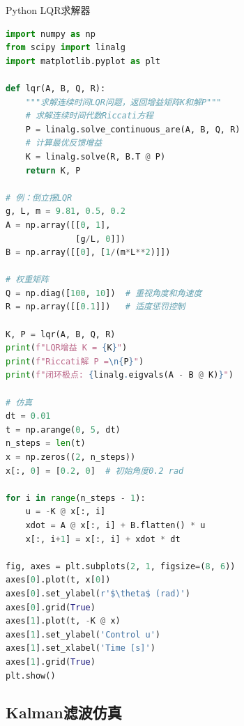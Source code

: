 \begin{mycode}{Python LQR求解器}
\begin{lstlisting}[language=Python]
import numpy as np
from scipy import linalg
import matplotlib.pyplot as plt

def lqr(A, B, Q, R):
    """求解连续时间LQR问题，返回增益矩阵K和解P"""
    # 求解连续时间代数Riccati方程
    P = linalg.solve_continuous_are(A, B, Q, R)
    # 计算最优反馈增益
    K = linalg.solve(R, B.T @ P)
    return K, P

# 例：倒立摆LQR
g, L, m = 9.81, 0.5, 0.2
A = np.array([[0, 1],
              [g/L, 0]])
B = np.array([[0], [1/(m*L**2)]])

# 权重矩阵
Q = np.diag([100, 10])  # 重视角度和角速度
R = np.array([[0.1]])   # 适度惩罚控制

K, P = lqr(A, B, Q, R)
print(f"LQR增益 K = {K}")
print(f"Riccati解 P =\n{P}")
print(f"闭环极点: {linalg.eigvals(A - B @ K)}")

# 仿真
dt = 0.01
t = np.arange(0, 5, dt)
n_steps = len(t)
x = np.zeros((2, n_steps))
x[:, 0] = [0.2, 0]  # 初始角度0.2 rad

for i in range(n_steps - 1):
    u = -K @ x[:, i]
    xdot = A @ x[:, i] + B.flatten() * u
    x[:, i+1] = x[:, i] + xdot * dt

fig, axes = plt.subplots(2, 1, figsize=(8, 6))
axes[0].plot(t, x[0])
axes[0].set_ylabel(r'$\theta$ (rad)')
axes[0].grid(True)
axes[1].plot(t, -K @ x)
axes[1].set_ylabel('Control u')
axes[1].set_xlabel('Time [s]')
axes[1].grid(True)
plt.show()
\end{lstlisting}
\end{mycode}

\subsection{Kalman滤波仿真}

